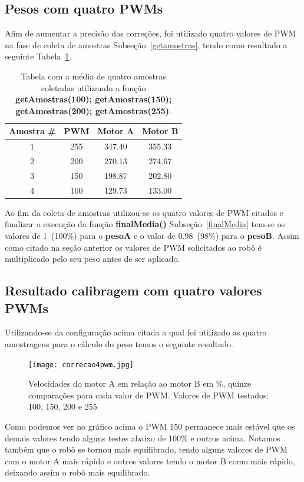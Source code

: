 \documentclass[a4paper,12pt,portuguese]{ufms-cpcx}
\begin{document}
\subsection{Pesos com quatro PWMs} \label{calibmult}
Afim de aumentar a precisão das correções, foi utilizado quatro valores de PWM na fase de coleta de amostras Subseção~\ref{getamostras}, tendo como resultado a seguinte Tabela~\ref{Tab:calibMC}.
\begin{table}[!h]
	\renewcommand{\arraystretch}{1.3}
	\centering
	\begin{tabular}{|c|c|cc|}
		\hline
		Amostra \# & PWM & Motor A & Motor B \\ \hline
		    1      & 255 & 347.40  & 355.33  \\
		    2      & 200 & 270.13  & 274.67  \\
		    3      & 150 & 198.87  & 202.80  \\
		    4      & 100 & 129.73  & 133.00  \\ \hline
	\end{tabular}
	\caption[Tabela de amostras PWM 100]{Tabela com a média de quatro amostras coletadas utilizando a função \textbf{getAmostras(100); getAmostras(150); getAmostras(200); getAmostras(255)}.}
	\label{Tab:calibMC}
\end{table}
Ao fim da coleta de amostras utilizou-se os quatro valores de PWM citados e finalizar a execução da função \textbf{finalMedia()} Subseção~\ref{finalMedia} tem-se os valores de 1~(100\%) para o \textbf{pesoA} e o valor de 0.98~(98\%) para o \textbf{pesoB}. Assim como citado na seção anterior os valores de PWM solicitados ao robô é multiplicado pelo seu peso antes de ser aplicado.

\subsection*{Resultado calibragem com quatro valores PWMs}
Utilizando-se da configuração acima citada a qual foi utilizado as quatro amostragens para o cálculo do peso temos o seguinte resultado.
\begin{figure}[H]	
	\centering
	\texttt{[image: correcao4pwm.jpg]}
	\caption{Velocidades do motor A em relação ao motor B em \%, quinze comparações para cada valor de PWM. Valores de PWM testados: 100, 150, 200 e 255}
	\label{fig:correcao4pwm}
\end{figure}
Como podemos ver no gráfico acima o PWM 150 permanece mais estável que os demais valores tendo alguns testes abaixo de 100\% e outros acima. Notamos também que o robô se tornou mais equilibrado, tendo alguns valores de PWM com o motor A mais rápido e outros valores tendo o motor B como mais rápido, deixando assim o robô mais equilibrado.
\end{document}
